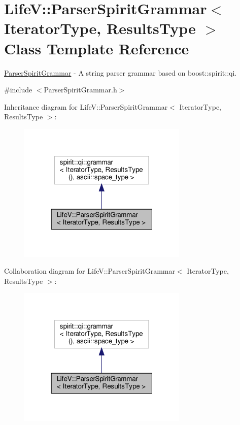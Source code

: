 \hypertarget{classLifeV_1_1ParserSpiritGrammar}{}\section{LifeV\+:\+:Parser\+Spirit\+Grammar$<$ Iterator\+Type, Results\+Type $>$ Class Template Reference}
\label{classLifeV_1_1ParserSpiritGrammar}


\hyperlink{classLifeV_1_1ParserSpiritGrammar}{Parser\+Spirit\+Grammar} -\/ A string parser grammar based on {\ttfamily boost\+::spirit\+::qi}.  




{\ttfamily \#include $<$Parser\+Spirit\+Grammar.\+h$>$}



Inheritance diagram for LifeV\+:\+:Parser\+Spirit\+Grammar$<$ Iterator\+Type, Results\+Type $>$\+:
\nopagebreak
\begin{figure}[H]
\begin{center}
\leavevmode
\includegraphics[width=229pt]{classLifeV_1_1ParserSpiritGrammar__inherit__graph}
\end{center}
\end{figure}


Collaboration diagram for LifeV\+:\+:Parser\+Spirit\+Grammar$<$ Iterator\+Type, Results\+Type $>$\+:
\nopagebreak
\begin{figure}[H]
\begin{center}
\leavevmode
\includegraphics[width=229pt]{classLifeV_1_1ParserSpiritGrammar__coll__graph}
\end{center}
\end{figure}
